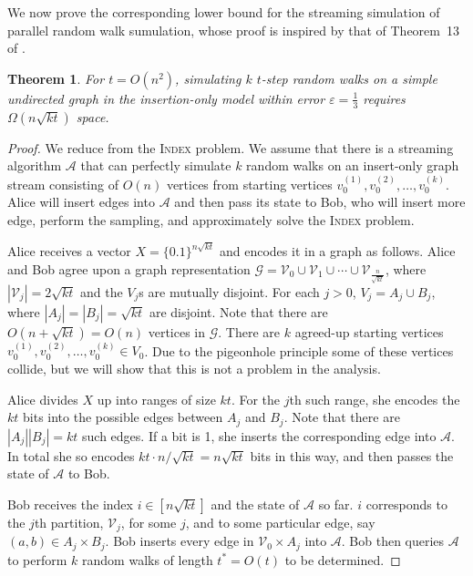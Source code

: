\documentclass{report}
\newtheorem{theorem}{Theorem}[section]
\newcommand{\algoname}[1]{\textnormal{\textsc{#1}}}
\begin{document}
We now prove the corresponding lower bound for the streaming simulation of parallel random walk sumulation, whose proof is inspired by that of Theorem~13 of \cite{jin2018simulating}.
%
\begin{theorem} \label{thm:rw:lower}
For $t = O(n^2)$, simulating $k$ $t$-step random walks on a simple undirected graph in the insertion-only model within error $\varepsilon = \frac{1}{3}$ requires $\Omega(n\sqrt{kt})$ space.
\end{theorem}
%
\begin{proof}
We reduce from the \algoname{Index} problem.
We assume that there is a streaming algorithm $\mathcal{A}$ that can perfectly simulate $k$ random walks on an insert-only graph stream
consisting of $O(n)$ vertices from starting vertices $v_0^{(1)}, v_0^{(2)}, \dots, v_0^{(k)}$.
Alice will insert edges into $\mathcal{A}$ and then pass its state to Bob, who will insert more edge, perform the sampling, and approximately solve the \algoname{Index} problem.

Alice receives a vector $X = \{0.1\}^{n\sqrt{kt}}$ and encodes it in a graph as follows.
Alice and Bob agree upon a graph representation $\mathcal{G} = \mathcal{V}_0 \cup \mathcal{V}_1 \cup \cdots \cup \mathcal{V}_{\frac{n}{\sqrt{kt}}}$, where $|\mathcal{V}_j| = 2 \sqrt{kt}$ and the $V_j$s are mutually disjoint.
For each $j >0$, $V_j = A_j \cup B_j$, where $|A_j| = |B_j| = \sqrt{kt}$ are disjoint.
Note that there are $O(n + \sqrt{kt}) = O(n)$ vertices in $\mathcal{G}$.
There are $k$ agreed-up starting vertices $v_0^{(1)}, v_0^{(2)}, \dots, v_0^{(k)} \in V_0$.
Due to the pigeonhole principle some of these vertices collide, but we will show that this is not a problem in the analysis.

Alice divides $X$ up into ranges of size $kt$.
For the $j$th such range, she encodes the $kt$ bits into the possible edges between $A_j$ and $B_j$.
Note that there are $|A_j||B_j| = kt$ such edges.
If a bit is 1, she inserts the corresponding edge into $\mathcal{A}$. 
In total she so encodes $kt \cdot n/\sqrt{kt} = n\sqrt{kt}$ bits in this way, and then passes the state of $\mathcal{A}$ to Bob. 

Bob receives the index $i \in [n\sqrt{kt}]$ and the state of $\mathcal{A}$ so far.
$i$ corresponds to the $j$th partition, $\mathcal{V}_j$, for some $j$, and to some particular edge, say $(a,b) \in A_j \times B_j$.
Bob inserts every edge in $\mathcal{V}_0 \times A_j$ into $\mathcal{A}$.
Bob then queries $\mathcal{A}$ to perform $k$ random walks of length $t^* = O(t)$ to be determined.


\end{proof}
\end{document}
